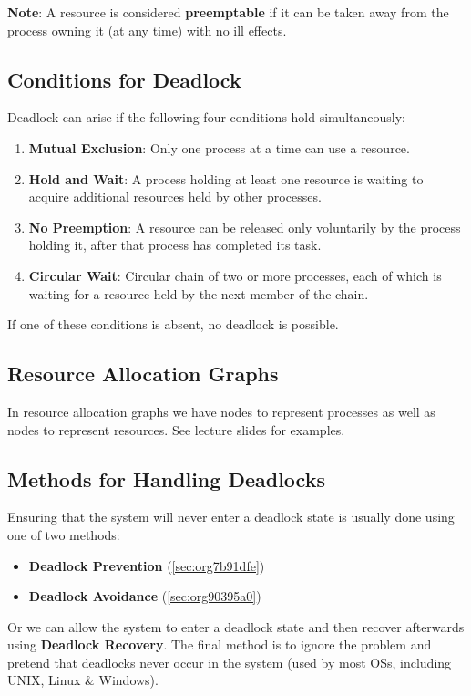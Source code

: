 \documentclass{article}%
\begin{document}
\textbf{Note}: A resource is considered \textbf{preemptable} if it can be taken away from the process owning it (at any time) with no ill effects.

\subsection{Conditions for Deadlock}
\label{sec:org1b9ae0b}
Deadlock can arise if the following four conditions hold simultaneously:
\begin{enumerate}
\item \textbf{Mutual Exclusion}: Only one process at a time can use a resource.
\item \textbf{Hold and Wait}: A process holding at least one resource is waiting to acquire additional resources held by other processes.
\item \textbf{No Preemption}: A resource can be released only voluntarily by the process holding it, after that process has completed its task.
\item \textbf{Circular Wait}: Circular chain of two or more processes, each of which is waiting for a resource held by the next member of the chain.
\end{enumerate}

If one of these conditions is absent, no deadlock is possible.

\subsection{Resource Allocation Graphs}
\label{sec:orge126f67}
In resource allocation graphs we have nodes to represent processes as well as nodes to represent resources.
See lecture slides for examples.

\subsection{Methods for Handling Deadlocks}
\label{sec:orgeb5a494}
Ensuring that the system will never enter a deadlock state is usually done using one of two methods:
\begin{itemize}
\item \textbf{Deadlock Prevention} (\ref{sec:org7b91dfe})
\item \textbf{Deadlock Avoidance} (\ref{sec:org90395a0})
\end{itemize}
Or we can allow the system to enter a deadlock state and then recover afterwards using \textbf{Deadlock Recovery}.
The final method is to ignore the problem and pretend that deadlocks never occur in the system (used by most OSs, including UNIX, Linux \& Windows).
\end{document}
